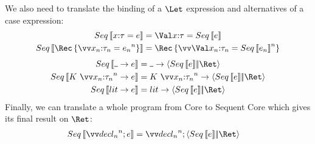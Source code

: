 \documentclass{article}
\begin{document}
We also need to translate the binding of a $\Let$ expression and alternatives of
a case expression:
\begin{align*}
  Seq\trans{\nonrec{\ann x \ty = \expr}}
  &=
  \nonrec{\bindv{\ann x \ty}{Seq\trans{\expr}}}
  \\
  Seq\trans{\rec{\vect[n]{\ann{x_n}{\ty_n} = \expr_n}}}
  &=
  \rec{\vect[n]{\bindv{\ann{x_n}{\ty_n}}{Seq\trans{\expr_n}}}}
\end{align*}
\begin{align*}
  Seq\trans{\blank \to \expr}%
  &=
  \blank \to \cut{Seq\trans{\expr}}{\ret r}
  \\
  Seq\trans{
    K ~ \vect[n]{\ann{x_n}{\ty_n}} \to \expr
  }%
  &=
  K ~ \vect[n]{\ann{x_n}{\ty_n}}
  \to
  \cut{Seq\trans{\expr}}{\ret r}
  \\
  Seq\trans{\lit \to \expr}%
  &=
  \lit \to \cut{Seq\trans{\expr}}{\ret r}
\end{align*}
Finally, we can translate a whole program from Core to Sequent Core which gives
its final result on $\ret r$:
\begin{align*}
  Seq\trans{\vect[n]{\decl_n}; e}%
  &=
  \vect[n]{\decl_n}; \cut{Seq\trans{e}}{\ret r}
\end{align*}
\end{document}
